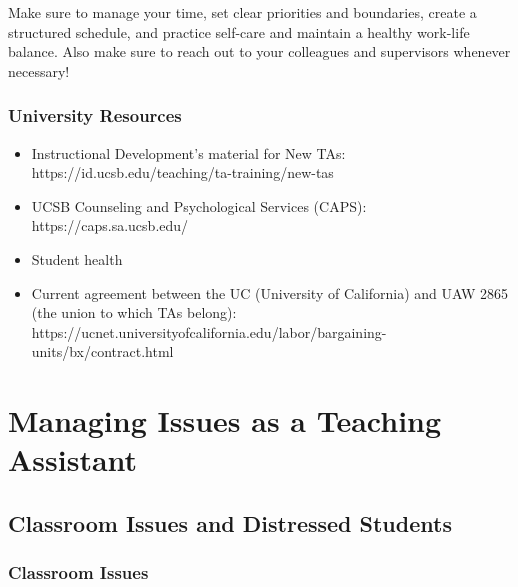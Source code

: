 \documentclass[
  letterpaper,
  DIV=11,
  numbers=noendperiod]{scrreprt}
\begin{document}
\begin{tcolorbox}[enhanced jigsaw, leftrule=.75mm, toprule=.15mm, arc=.35mm, title=\textcolor{quarto-callout-tip-color}{\faLightbulb}\hspace{0.5em}{Tip}, coltitle=black, breakable, titlerule=0mm, opacitybacktitle=0.6, colback=white, toptitle=1mm, opacityback=0, colbacktitle=quarto-callout-tip-color!10!white, colframe=quarto-callout-tip-color-frame, bottomtitle=1mm, rightrule=.15mm, bottomrule=.15mm, left=2mm]

Make sure to manage your time, set clear priorities and boundaries,
create a structured schedule, and practice self-care and maintain a
healthy work-life balance. Also make sure to reach out to your
colleagues and supervisors whenever necessary!

\end{tcolorbox}

\hypertarget{university-resources}{%
\section{University Resources}\label{university-resources}}

\begin{itemize}
\item
  Instructional Development's material for New TAs:
  https://id.ucsb.edu/teaching/ta-training/new-tas
\item
  UCSB Counseling and Psychological Services (CAPS):
  https://caps.sa.ucsb.edu/
\item
  Student health
\item
  Current agreement between the UC (University of California) and UAW
  2865 (the union to which TAs belong):
  https://ucnet.universityofcalifornia.edu/labor/bargaining-units/bx/contract.html
\end{itemize}

\part{\textbf{Managing Issues as a Teaching Assistant}}

\hypertarget{classroom-issues-and-distressed-students}{%
\chapter{Classroom Issues and Distressed
Students}\label{classroom-issues-and-distressed-students}}

\hypertarget{classroom-issues}{%
\section{Classroom Issues}\label{classroom-issues}}
\end{document}
